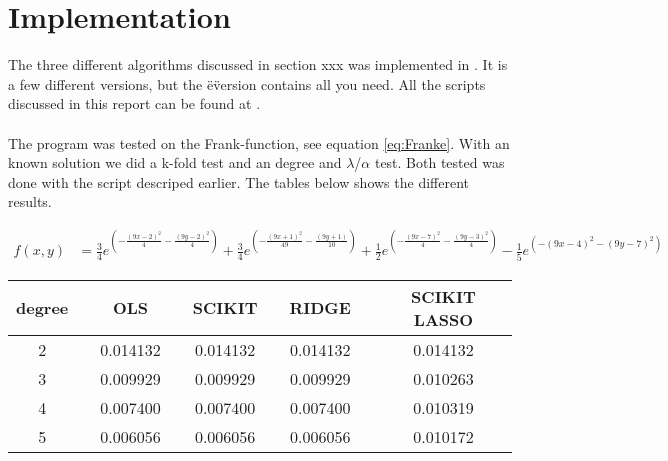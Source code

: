 
\pagebreak
\section{Implementation}

The three different algorithms discussed in section xxx was implemented in
\href{https://github.com/erikfsk/fysstk4155-project-1/blob/master/project/project-e.py}{\color{blue}{our script}}.
It is a few different versions, but the \"e\" version contains all you need.
All the scripts discussed in this report can be found at
\href{https://github.com/erikfsk/fysstk4155-project-1/}{\color{blue}{our github}}.
\\
\\
The program was tested on the Frank-function, see equation \ref{eq:Franke}.
With an known solution we did a k-fold test and an degree and $\lambda$/$\alpha$ test.
Both tested was done with the script descriped earlier.
The tables below shows the different results.

\begin{align}
f(x,y) &=
\frac{3}{4} e^{\left(-\frac{(9x-2)^2}{4} - \frac{(9y-2)^2}{4}\right)}
+\frac{3}{4} e^{\left(-\frac{(9x+1)^2}{49}- \frac{(9y+1)}{10}\right)}
+\frac{1}{2} e^{\left(-\frac{(9x-7)^2}{4} - \frac{(9y-3)^2}{4}\right)}
 -\frac{1}{5} e^{\left(-(9x-4)^2 - (9y-7)^2\right)}
\label{eq:Franke}
\end{align}

\begin{center}
\label{tab:k-fold}
\begin{tabularx}{\textwidth}{c X c X c X c X c}
    \hline
    \hline
        degree && OLS && SCIKIT && RIDGE && SCIKIT LASSO\\
    \hline
        2   	&&      0.014132	&&	0.014132 	&&	0.014132  &&	0.014132	\\
        3   	&&      0.009929	&&	0.009929	&&	0.009929  &&	0.010263	\\
        4   	&&      0.007400	&&	0.007400	&&	0.007400  &&	0.010319	\\
        5   	&&      0.006056	&&	0.006056	&&	0.006056  &&	0.010172	\\
    \hline
\end{tabularx}
\end{center}



